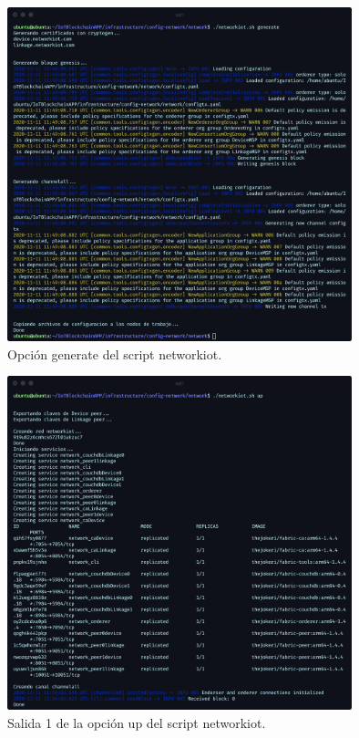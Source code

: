 \begin{figure}[ht!]
  \centering
  \includegraphics[width=10cm]{imagenes/desarrollo/comandos/generate}
  \caption{Opción generate del script networkiot.}
  \label{fig:generate}
\end{figure}

\begin{figure}[ht!]
  \centering
  \includegraphics[width=10cm]{imagenes/desarrollo/comandos/up_1}
  \caption{Salida 1 de la opción up del script networkiot.}
  \label{fig:up-1}
\end{figure}

